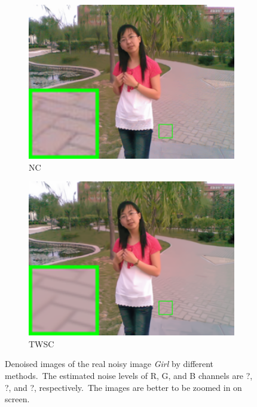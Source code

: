 \begin{figure}
\begin{subfigure}[t]{0.24\textwidth}
        \includegraphics[width=1\textwidth]{images/twsc/nc/resize_br_NC_chinesegirl.png}
		\caption{NC}
    \end{subfigure}
    \hfill
    \begin{subfigure}[t]{0.24\textwidth}
        \centering
        \includegraphics[width=1\textwidth]{images/twsc/nc/resize_br_TWSC_chinesegirl.png}
		\caption{TWSC}
    \end{subfigure}
    \caption{Denoised images of the real noisy image \textsl{Girl} \cite{ncwebsite} by different methods.\ The estimated noise levels of R, G, and B channels are ?, ?, and ?, respectively.\ The images are better to be zoomed in on screen.}
    \label{fig5-10}
\end{figure}


